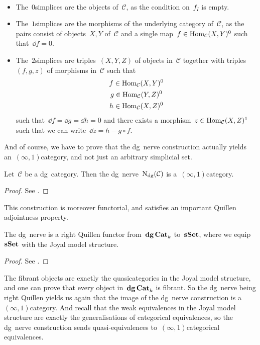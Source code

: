 \begin{example} {\ }
  \label{example:low-degree-interpretation}
  \begin{itemize}
    \item The~$0$\dash simplices are the objects of~$\mathcal{C}$, as the condition on~$f_I$ is empty.
    \item The~$1$\dash simplices are the morphisms of the underlying category of~$\mathcal{C}$, as the pairs consist of objects~$X,Y$ of~$\mathcal{C}$ and a single map~$f\in\mathrm{Hom}_{\mathcal{C}}(X,Y)^0$ such that~$\dd f=0$.
    \item The~$2$\dash simplices are triples~$(X,Y,Z)$ of objects in~$\mathcal{C}$ together with triples~$(f,g,z)$ of morphisms in~$\mathcal{C}$ such that
      \begin{equation}
        \begin{gathered}
          f\in\mathrm{Hom}_{\mathcal{C}}(X,Y)^0 \\
          g\in\mathrm{Hom}_{\mathcal{C}}(Y,Z)^0 \\
          h\in\mathrm{Hom}_{\mathcal{C}}(X,Z)^0 \\
        \end{gathered}
      \end{equation}
      such that~$\dd f=\dd g=\dd h=0$ and there exists a morphism~$z\in\mathrm{Hom}_{\mathcal{C}}(X,Z)^1$ such that we can write~$\dd z=h-g\circ f$.
  \end{itemize}
\end{example}
And of course, we have to prove that the dg~nerve construction actually yields an~$(\infty,1)$\dash category, and not just an arbitrary simplicial set.
\begin{proposition}
  Let~$\mathcal{C}$ be a dg~category. Then the dg~nerve~$\operatorname{N}_{\mathrm{dg}}(\mathcal{C})$ is a~$(\infty,1)$\dash category.
  \begin{proof}
    See \cite[proposition 1.3.1.10]{htt}.
  \end{proof}
\end{proposition}
This construction is moreover functorial, and satisfies an important Quillen adjointness property.
\begin{proposition}
  The dg~nerve is a right Quillen functor from~$\mathbf{dg\,Cat}_k$ to~$\mathbf{s\,\!\mathbf{Set}}$, where we equip~$\mathbf{s\,\!\mathbf{Set}}$ with the Joyal model structure.
  \begin{proof}
    See \cite[proposition 1.3.1.20]{htt}.
  \end{proof}
\end{proposition}
The fibrant objects are exactly the quasicategories in the Joyal model structure, and one can prove that every object in~$\mathbf{dg\,Cat}_k$ is fibrant. So the dg~nerve being right Quillen yields us again that the image of the dg~nerve construction is a~$(\infty,1)$\dash category. And recall that the weak equivalences in the Joyal model structure are exactly the generalisations of categorical equivalences, so the dg~nerve construction sends quasi-equivalences to~$(\infty,1)$\dash categorical equivalences.
